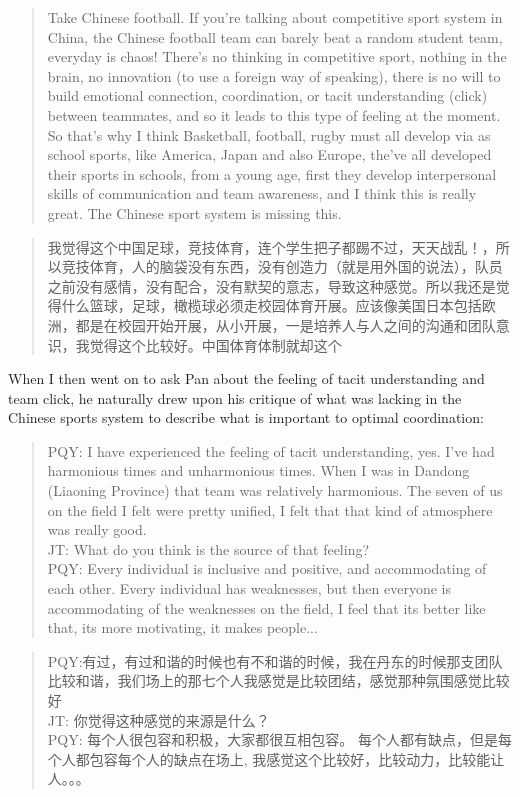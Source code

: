 \begin{CJK}{UTF8}{gbsn}
\begin{quote}
  Take Chinese football.  If you’re talking about competitive sport system in China, the Chinese football team can barely beat a random student team, everyday is chaos! There’s no thinking in competitive sport, nothing in the brain, no innovation (to use a foreign way of speaking), there is no will to build emotional connection, coordination, or tacit understanding (click) between teammates, and so it leads to this type of feeling at the moment.  So that's why I think Basketball, football, rugby must all develop via as school sports, like America, Japan and also Europe, the’ve all developed their sports in schools, from a young age, first they develop interpersonal skills of communication and team awareness, and I think this is really great.  The Chinese sport system is missing this.
\end{quote}

\begin{quote}
  我觉得这个中国足球，竞技体育，连个学生把子都踢不过，天天战乱！，所以竞技体育，人的脑袋没有东西，没有创造力（就是用外国的说法），队员之前没有感情，没有配合，没有默契的意志，导致这种感觉。所以我还是觉得什么篮球，足球，橄榄球必须走校园体育开展。应该像美国日本包括欧洲，都是在校园开始开展，从小开展，一是培养人与人之间的沟通和团队意识，我觉得这个比较好。中国体育体制就却这个
\end{quote}

When I then went on to ask Pan about the feeling of tacit understanding and team click, he naturally drew upon his critique of what was lacking in the Chinese sports system to describe what is important to optimal coordination:

\begin{quote}
  PQY: I have experienced the feeling of tacit understanding, yes. I've had harmonious times and unharmonious times. When I was in Dandong (Liaoning Province) that team was relatively harmonious.  The seven of us on the field I felt were pretty unified, I felt that that kind of atmosphere was really good. \\
  JT: What do you think is the source of that feeling? \\
  PQY: Every individual is inclusive and positive, and accommodating of each other. Every individual has weaknesses, but then everyone is accommodating of the weaknesses on the field, I feel that its better like that, its more motivating, it makes people...
\end{quote}

\begin{quote}
  PQY:有过，有过和谐的时候也有不和谐的时候，我在丹东的时候那支团队比较和谐，我们场上的那七个人我感觉是比较团结，感觉那种氛围感觉比较好 \\
  JT: 你觉得这种感觉的来源是什么？\\
  PQY: 每个人很包容和积极，大家都很互相包容。 每个人都有缺点，但是每个人都包容每个人的缺点在场上, 我感觉这个比较好，比较动力，比较能让人。。。
\end{quote}



\end{CJK}
